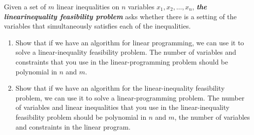 \documentclass[11pt, a4paper, UTF8]{ctexart}
\begin{document}
\begin{problem}
Given a set of $m$ linear inequalities on $n$ variables $x_1, x_2, \ldots, x_n$, \textit{\textbf{the linearinequality feasibility problem}} asks whether there is a setting of the variables that simultaneously satisfies each of the inequalities.
\begin{enumerate}[label = \alph*.]
\item Show that if we have an algorithm for linear programming, we can use it to solve a linear-inequality feasibility problem. The number of variables and constraints that you use in the linear-programming problem should be polynomial in $n$ and $m$.

\item Show that if we have an algorithm for the linear-inequality feasibility problem, we can use it to solve a linear-programming problem. The number of variables and linear inequalities that you use in the linear-inequality feasibility problem should be polynomial in $n$ and $m$, the number of variables and constraints in the linear program.
\end{enumerate}
\end{problem}
\begin{solution}
    
\end{solution}


%







%





\end{document}
